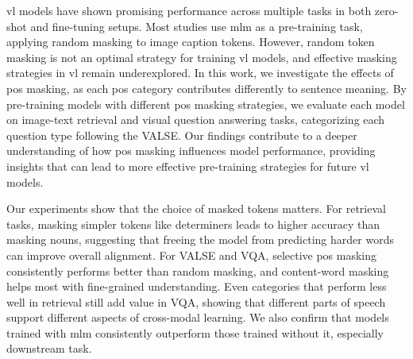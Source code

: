 
\setlength{\parindent}{0pt}
\setlength{\parskip}{1em}
\setlength{\baselineskip}{1.5em}

\begin{center}
  \fontsize{14}{17}
\end{center}
\vspace{2em}

\acrfull{vl} models have shown promising performance across multiple tasks in both zero-shot and fine-tuning setups. 
Most studies use \acrlong{mlm} as a pre-training task, applying random masking to image caption tokens. 
However, random token masking is not an optimal strategy for training \acrshort{vl} models, and effective masking strategies in \acrshort{vl} remain underexplored. 
In this work, we investigate the effects of \acrfull{pos} masking, as each \acrshort{pos} category contributes differently to sentence meaning. 
By pre-training models with different \acrshort{pos} masking strategies, we evaluate each model on image-text retrieval and visual question answering tasks, categorizing each question type following the VALSE.
Our findings contribute to a deeper understanding of how \acrshort{pos} masking influences model performance, providing insights that can lead to more effective pre-training strategies for future \acrshort{vl} models.

Our experiments show that the choice of masked tokens matters.
For retrieval tasks, masking simpler tokens like determiners leads to higher accuracy than masking nouns, suggesting that freeing the model from predicting harder words can improve overall alignment.
For VALSE and VQA, selective \acrshort{pos} masking consistently performs better than random masking, and content-word masking helps most with fine-grained understanding.
Even categories that perform less well in retrieval still add value in VQA, showing that different parts of speech support different aspects of cross-modal learning.
We also confirm that models trained with \acrshort{mlm} consistently outperform those trained without it, especially downstream task.

    
